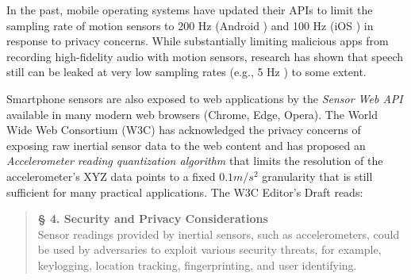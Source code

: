 \documentclass[sigconf, nonacm]{acmart}
\begin{document}
In the past, mobile operating systems have updated their APIs to limit the sampling rate of motion sensors to 200 Hz (Android \cite{AndroidDeveloperSensorDocs}) and 100 Hz (iOS \cite{AppleDeveloperAccelerometerData}\cite{AppleDeveloperGyroscopeData}) in response to privacy concerns.
While substantially limiting malicious apps from recording high-fidelity audio with motion sensors, research has shown that speech still can be leaked at very low sampling rates (e.g., 5 Hz \cite{WatchTheRhythm2024}) to some extent.

Smartphone sensors are also exposed to web applications by the \textit{Sensor Web API} \cite{MDNWebDocsSensorAPI} available in many modern web browsers (Chrome, Edge, Opera).
The World Wide Web Consortium (W3C) has acknowledged the privacy concerns of exposing raw inertial sensor data to the web content and has proposed an \textit{Accelerometer reading quantization algorithm} \cite{W3CAccelerometerQuantization} that limits the resolution of the accelerometer's XYZ data points to a fixed $0.1 m/s^2$ granularity that is still sufficient for many practical applications.
The W3C Editor's Draft \cite{W3CAccelerometerQuantization} reads:
\begin{quote}
\vspace{0.1cm}
\textbf{§ 4. Security and Privacy Considerations} \\
Sensor readings provided by inertial sensors, such as accelerometers, could be used by adversaries to exploit various security threats, for example, keylogging, location tracking, fingerprinting, and user identifying.
\end{quote}
\end{document}
